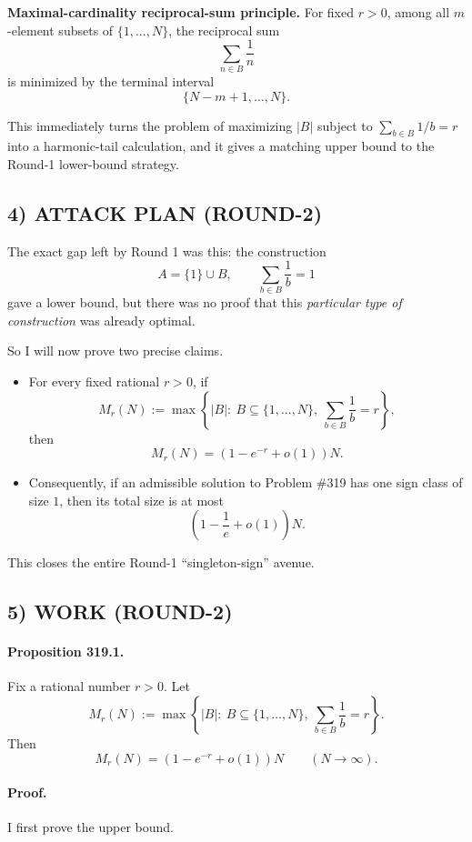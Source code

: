 \medskip
\noindent
\textbf{Maximal-cardinality reciprocal-sum principle.}
For fixed $r>0$, among all $m$-element subsets of $\{1,\dots,N\}$, the reciprocal sum
\[
\sum_{n\in B}\frac1n
\]
is minimized by the terminal interval
\[
\{N-m+1,\dots,N\}.
\]

This immediately turns the problem of maximizing $|B|$ subject to $\sum_{b\in B}1/b=r$ into a harmonic-tail calculation, and it gives a matching upper bound to the Round-1 lower-bound strategy.

\subsection*{4) ATTACK PLAN (ROUND-2)}
The exact gap left by Round 1 was this: the construction
\[
A=\{1\}\cup B,\qquad \sum_{b\in B}\frac1b=1
\]
gave a lower bound, but there was no proof that this \emph{particular type of construction} was already optimal.

So I will now prove two precise claims.

\begin{itemize}
\item[(i)] For every fixed rational $r>0$, if
\[
M_r(N):=\max\left\{|B|:\ B\subseteq \{1,\dots,N\},\ \sum_{b\in B}\frac1b=r\right\},
\]
then
\[
M_r(N)=\left(1-e^{-r}+o(1)\right)N.
\]
\item[(ii)] Consequently, if an admissible solution to Problem \#319 has one sign class of size $1$, then its total size is at most
\[
\left(1-\frac1e+o(1)\right)N.
\]
\end{itemize}

This closes the entire Round-1 ``singleton-sign'' avenue.

\subsection*{5) WORK (ROUND-2)}

\paragraph{Proposition 319.1.}
Fix a rational number $r>0$.  Let
\[
M_r(N):=\max\left\{|B|:\ B\subseteq \{1,\dots,N\},\ \sum_{b\in B}\frac1b=r\right\}.
\]
Then
\[
M_r(N)=\left(1-e^{-r}+o(1)\right)N
\qquad (N\to\infty).
\]

\paragraph{Proof.}
I first prove the upper bound.

